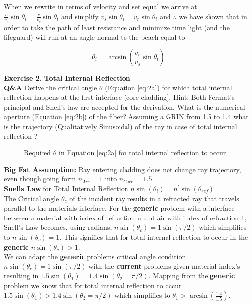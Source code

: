 \documentclass[main.tex]{subfiles}
\begin{document}
When we rewrite in terms of velocity and set equal we arrive at $\frac{c}{v_r}\sin{\theta_i} = \frac{c}{v_s} \sin{\theta_t}$ and simplify $v_s\sin{\theta_i} = {v_r}\sin{\theta_t}$ and $\therefore$ we have shown that in order to take the path of least resistance and minimize time light (and the lifeguard) will run at an angle normal to the beach equal to 

\begin{equation}\label{sol1a}
\theta_i = \arcsin{(\frac{v_r}{v_s} \sin{\theta_t})}
\end{equation}

\textbf{Exercise 2. Total Internal Reflection}\\
\textbf{Q\&A} Derive the critical angle $\theta$ (Equation \ref{eq:2a}) for which total internal reflection happens at the first interface (core-cladding). Hint: Both Fermat's principal and Snell's law are accepted for the derivation. What is the numerical aperture (Equation \ref{eq:2b}) of the fiber? Assuming a GRIN from 1.5 to 1.4 what is the trajectory (Qualitatively Sinusoidal) of the ray in case of total internal reflection ? \\

\begin{figure}
\centering{}
\caption{Required $\theta$ in Equation \ref{eq:2a} for total internal reflection to occur}
\label{fig:2}
\end{figure}

\textbf{Big Fat Assumption:} Ray entering cladding does not change ray trajectory, even though going form $n_{Air} = 1$ into $n_{Core} = 1.5$\\

\textbf{Snells Law} for Total Internal Reflection $n\sin(\theta_i) = n^{\prime}\sin(\theta_{ref})$\\

The Critical angle $\theta_c$ of the incident ray results in a refracted ray that travels parallel to the materials interface. For the \textbf{generic} problem with a interface between a material with index of refraction n and air with index of refraction 1, Snell's Law becomes, using radians, $n\sin(\theta_c) = 1\sin(\pi/2)$ which simplifies to $n\sin(\theta_c) = 1$. This signifies that for total internal reflection to occur in the \textbf{generic}  $n\sin(\theta_c) > 1$. \\

We can adapt the \textbf{generic} problems critical angle condition $n\sin(\theta_c) = 1\sin(\pi/2)$ with the \textbf{current} problems given material index's resulting in  $1.5\sin(\theta_1) = 1.4\sin(\theta_2 = \pi/2)$. Mapping from the \textbf{generic} problem we know that for total internal reflection to occur $1.5\sin(\theta_1) > 1.4\sin(\theta_2 = \pi/2)$ which simplifies to $\theta_1 > \arcsin(\frac{1.4}{1.5})$.\\
\end{document}
